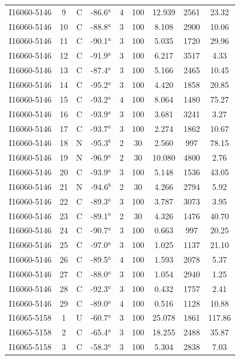 \begin{table}
\begin{tabular}{ccccccccc}
I16060-5146 & 9 & C & -86.6$^{a}$ & 4 & 100 & 12.939 & 2561 & 23.32 \\
I16060-5146 & 10 & C & -88.8$^{a}$ & 3 & 100 & 8.108 & 2900 & 10.06 \\
I16060-5146 & 11 & C & -90.1$^{a}$ & 3 & 100 & 5.035 & 1720 & 29.96 \\
I16060-5146 & 12 & C & -91.9$^{a}$ & 3 & 100 & 6.217 & 3517 & 4.33 \\
I16060-5146 & 13 & C & -87.4$^{a}$ & 3 & 100 & 5.166 & 2465 & 10.45 \\
I16060-5146 & 14 & C & -95.2$^{a}$ & 3 & 100 & 4.420 & 1858 & 20.85 \\
I16060-5146 & 15 & C & -93.2$^{a}$ & 4 & 100 & 8.064 & 1480 & 75.27 \\
I16060-5146 & 16 & C & -93.9$^{a}$ & 3 & 100 & 3.681 & 3241 & 3.27 \\
I16060-5146 & 17 & C & -93.7$^{a}$ & 3 & 100 & 2.274 & 1862 & 10.67 \\
I16060-5146 & 18 & N & -95.3$^{b}$ & 2 & 30 & 2.560 & 997 & 78.15 \\
I16060-5146 & 19 & N & -96.9$^{a}$ & 2 & 30 & 10.080 & 4800 & 2.76 \\
I16060-5146 & 20 & C & -93.9$^{a}$ & 3 & 100 & 5.148 & 1536 & 43.05 \\
I16060-5146 & 21 & N & -94.6$^{b}$ & 2 & 30 & 4.266 & 2794 & 5.92 \\
I16060-5146 & 22 & C & -89.3$^{a}$ & 3 & 100 & 3.787 & 3073 & 3.95 \\
I16060-5146 & 23 & C & -89.1$^{a}$ & 2 & 30 & 4.326 & 1476 & 40.70 \\
I16060-5146 & 24 & C & -90.7$^{a}$ & 3 & 100 & 0.663 & 997 & 20.25 \\
I16060-5146 & 25 & C & -97.0$^{a}$ & 3 & 100 & 1.025 & 1137 & 21.10 \\
I16060-5146 & 26 & C & -89.5$^{a}$ & 4 & 100 & 1.593 & 2078 & 5.37 \\
I16060-5146 & 27 & C & -88.0$^{a}$ & 3 & 100 & 1.054 & 2940 & 1.25 \\
I16060-5146 & 28 & C & -92.3$^{a}$ & 3 & 100 & 0.432 & 1757 & 2.41 \\
I16060-5146 & 29 & C & -89.0$^{a}$ & 4 & 100 & 0.516 & 1128 & 10.88 \\
I16065-5158 & 1 & U & -60.7$^{a}$ & 3 & 100 & 25.078 & 1861 & 117.86 \\
I16065-5158 & 2 & C & -65.4$^{a}$ & 3 & 100 & 18.255 & 2488 & 35.87 \\
I16065-5158 & 3 & C & -58.3$^{a}$ & 3 & 100 & 5.304 & 2838 & 7.03 \\

\end{tabular}
\end{table}

